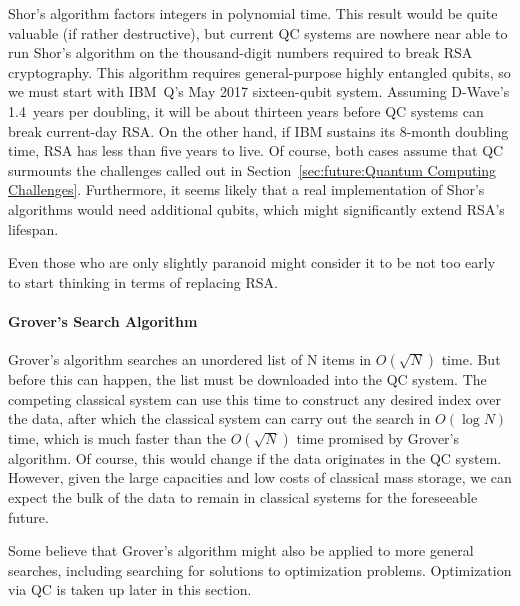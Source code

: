 Shor's algorithm factors integers in polynomial time.
This result would be quite valuable (if rather destructive),
but current QC systems are nowhere near able to run
Shor's algorithm on the thousand-digit numbers required
to break RSA cryptography.
This algorithm requires general-purpose highly entangled qubits,
so we must start with IBM~Q's May 2017 sixteen-qubit system.
Assuming D-Wave's 1.4~years per doubling, it will be about thirteen
years before QC systems can break current-day RSA.
On the other hand, if IBM sustains its 8-month doubling time, RSA has
less than five years to live.
Of course, both cases assume that QC surmounts the challenges called
out in Section~\ref{sec:future:Quantum Computing Challenges}.
Furthermore, it seems likely that a real implementation of Shor's
algorithms would need additional qubits, which might significantly extend
RSA's lifespan.

Even those who are only slightly paranoid might consider it to be not
too early to start thinking in terms of replacing RSA.

\paragraph{Grover's Search Algorithm}
\label{sec:future:Grover's Search Algorithm}

Grover's algorithm searches an unordered list of N items
in $O(\sqrt N)$ time.
But before this can happen, the list must be downloaded into
the QC system.
The competing classical system can use this time to construct
any desired index over the data, after which the classical
system can carry out the search in $O(\log N)$ time, which
is much faster than the $O(\sqrt N)$ time promised by
Grover's algorithm.
Of course, this would change if the data originates in the
QC system.
However, given the large capacities and low costs of
classical mass storage, we can expect the bulk of the data to remain
in classical systems for the foreseeable future.

Some believe that Grover's algorithm might also be applied to more general
searches, including searching for solutions to optimization problems.
Optimization via QC is taken up later in this section.

